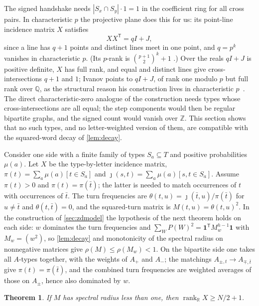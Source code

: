 \documentclass[11pt]{article}
\newtheorem{thm}{Theorem}[section]
\theoremstyle{definition}
\theoremstyle{plain}
\newcommand{\Z}{\mathbb{Z}}
\newcommand{\R}{\mathbb{R}}
\newcommand{\Q}{\mathbb{Q}}
\newcommand{\one}{\mathbf{1}}
\DeclareMathOperator{\rank}{rank}
\begin{document}
The signed handshake needs $|S_x\cap S_y|\cdot1=1$ in the coefficient ring for all cross pairs. In characteristic $p$ the projective plane does this for us: its point-line incidence matrix $X$ satisfies
\[
XX^{\mathsf T}=qI+J,
\]
since a line has $q+1$ points and distinct lines meet in one point, and $q=p^k$ vanishes in characteristic $p$. (Its $p$-rank is $\binom{p+1}{2}^k+1$ \cite{MacWilliamsMann1968,Smith1969}.) Over the reals $qI+J$ is positive definite, $X$ has full rank, and equal and distinct lines give cross-intersections $q+1$ and $1$; Ivanov points to $qI+J$, of rank one modulo $p$ but full rank over $\Q$, as the structural reason his construction lives in characteristic $p$~\cite[\S\S1.5 and~3]{Ivanov2026}. The direct characteristic-zero analogue of the construction needs types whose cross-intersections are all equal; the step components would then be regular bipartite graphs, and the signed count would vanish over $\Z$. This section shows that no such types, and no letter-weighted version of them, are compatible with the squared-word decay of \cref{lem:decay}.

Consider one side with a finite family of types $S_a\subseteq T$ and positive probabilities $\mu(a)$. Let $X$ be the type-by-letter incidence matrix, $\pi(t)=\sum_a\mu(a)[t\in S_a]$ and $\jmath(s,t)=\sum_a\mu(a)[s,t\in S_a]$. Assume $\pi(t)>0$ and $\pi(t)=\pi(\bar t)$; the latter is needed to match occurrences of $t$ with occurrences of $\bar t$. The turn frequencies are $\theta(t,u)=\jmath(\bar t,u)/\pi(\bar t)$ for $u\ne\bar t$ and $\theta(t,\bar t)=0$, and the squared-turn matrix is $M(t,u)=\theta(t,u)^2$. In the construction of \cref{sec:zdmodel} the hypothesis of the next theorem holds on each side: $w$ dominates the turn frequencies and $\sum_WP(W)^2=\one^{\mathsf T}M_w^{h-1}\one$ with $M_w=(w^2)$, so \cref{lem:decay} and monotonicity of the spectral radius on nonnegative matrices give $\rho(M)\le\rho(M_w)<1$. On the bipartite side one takes all $A$-types together, with the weights of $A_+$ and $A_-$; the matchings $A_{\pm,t}\to A_{\mp,\bar t}$ give $\pi(t)=\pi(\bar t)$, and the combined turn frequencies are weighted averages of those on $A_\pm$, hence also dominated by $w$.

\begin{thm}\label{thm:rank}
If $M$ has spectral radius less than one, then $\rank_\R X\ge N/2+1$.
\end{thm}
\end{document}

